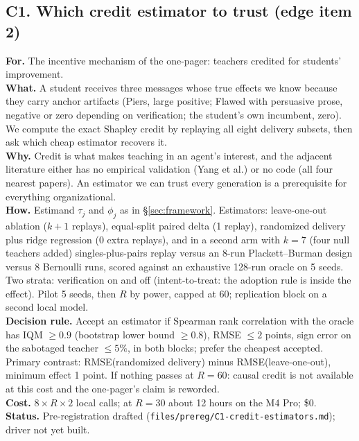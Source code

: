 \documentclass[11pt]{article}
\begin{document}
\subsection{C1. Which credit estimator to trust (edge item 2)}\label{sec:c1}
\textbf{For.} The incentive mechanism of the one-pager: teachers credited for students' improvement.\\
\textbf{What.} A student receives three messages whose true effects we know because they carry anchor artifacts
(Piers, large positive; Flawed with persuasive prose, negative or zero depending on verification; the student's own
incumbent, zero). We compute the exact Shapley credit by replaying all eight delivery subsets, then ask which cheap
estimator recovers it.\\
\textbf{Why.} Credit is what makes teaching in an agent's interest, and the adjacent literature either has no
empirical validation (Yang et al.) or no code (all four nearest papers). An estimator we can trust every generation
is a prerequisite for everything organizational.\\
\textbf{How.} Estimand $\tau_j$ and $\phi_j$ as in \S\ref{sec:framework}. Estimators: leave-one-out ablation
($k+1$ replays), equal-split paired delta (1 replay), randomized delivery plus ridge regression (0 extra replays),
and in a second arm with $k=7$ (four null teachers added) singles-plus-pairs replay versus an 8-run Plackett--Burman
design versus 8 Bernoulli runs, scored against an exhaustive 128-run oracle on 5 seeds. Two strata: verification on
and off (intent-to-treat: the adoption rule is inside the effect). Pilot 5 seeds, then $R$ by power, capped at 60;
replication block on a second local model.\\
\textbf{Decision rule.} Accept an estimator if Spearman rank correlation with the oracle has IQM $\ge0.9$ (bootstrap
lower bound $\ge0.8$), RMSE $\le2$ points, sign error on the sabotaged teacher $\le5\%$, in both blocks; prefer the
cheapest accepted. Primary contrast: RMSE(randomized delivery) minus RMSE(leave-one-out), minimum effect 1 point.
If nothing passes at $R=60$: causal credit is not available at this cost and the one-pager's claim is reworded.\\
\textbf{Cost.} $8\times R\times 2$ local calls; at $R=30$ about 12 hours on the M4 Pro; \$0.\\
\textbf{Status.} Pre-registration drafted (\texttt{files/prereg/C1-credit-estimators.md}); driver not yet built.
\end{document}

